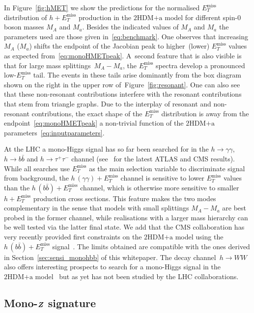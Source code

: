 \documentclass[a4paper, 11pt,notoc]{article}
\newcommand{\MET}{\ensuremath{E_T^\mathrm{miss}}\xspace}
\newcommand{\mA}{\ensuremath{M_{A}}\xspace}
\newcommand{\ma}{\ensuremath{M_{a}}\xspace}
\newcommand{\hdma}{\ensuremath{\textrm{2HDM+a}}\xspace}
\def\bm#1{\mbox{\boldmath$#1$\unboldmath}}
\begin{document}
In Figure~\ref{fig:hMET} we show the predictions for the normalised $\MET$ distribution of $h+\MET$ production in the \hdma model for different spin-0 boson masses $\mA$ and $\ma$. Besides the indicated values of $\mA$ and $\ma$ the parameters  used  are those given in~\eqref{eq:benchmark}. One observes that increasing~$\mA$ ($\ma$) shifts the endpoint of the Jacobian peak to higher~(lower) $\MET$  values as expected from~\eqref{eq:monoHMETpeak}. A~second feature that is also visible is that for large mass splittings~$\mA - \ma$, the $\MET$ spectra develop a pronounced low-$\MET$ tail. The events in these tails arise dominantly from the box diagram shown on the right in the upper row of~Figure~\ref{fig:resonant}. One can also see that these non-resonant contributions interfere with the resonant contributions that stem from triangle graphs. Due to the interplay of resonant and non-resonant contributions,  the exact shape of the $\MET$ distribution is   away from the endpoint~\eqref{eq:monoHMETpeak} a non-trivial function of the \hdma parameters~\eqref{eq:inputparameters}.  

 At the LHC a mono-Higgs signal has so far been searched for in the $h \to \gamma \gamma$, $h \to b \bar b$ and $h \to \tau^+ \tau^-$ channel (see~\cite{Aaboud:2017uak,ATLAS-CONF-2018-039,CMS-PAS-EXO-16-050,CMS:2018yme}  for the latest ATLAS and CMS results).  While all searches use $\MET$ as the main selection variable to discriminate signal from background,  the  $h \, (\gamma \gamma) + \MET$  channel  is sensitive to lower $\MET$ values than the $h \, (b \bar b) + \MET$  channel, which is otherwise more sensitive to smaller $h + \MET$ production cross sections. This feature makes the two modes complementary in the sense that  models with  small  splittings $\mA - \ma$ are best probed in the former channel, while realisations with a larger mass hierarchy can be well tested via the latter final state. We add that the CMS collaboration has very recently provided first constraints on the \hdma model using the $h \, (b \bar b) + \MET$ signal~\cite{CMS-PAS-EXO-16-050}. The limits obtained are compatible with the ones derived in Section~\ref{sec:sensi_monohbb} of this whitepaper. The decay channel~$h \to WW$ also offers interesting prospects to search for a mono-Higgs signal in the \hdma model~\cite{GPHeidelberg} but as yet has not been studied by the LHC collaborations.  

\subsection*{Mono-$\bm{Z}$ signature}
\end{document}

